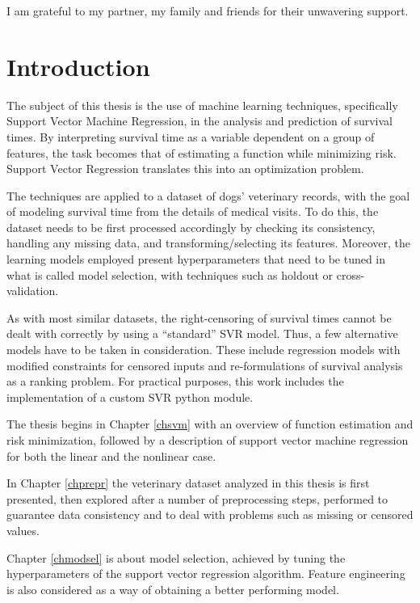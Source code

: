 \documentclass[12pt]{report}
\begin{document}
I am grateful to my partner, my family and friends for their unwavering support.

\afterpreface


\chapter*{Introduction}
\label{intro}
The subject of this thesis is the use of machine learning techniques, specifically Support Vector Machine Regression, in the analysis and prediction of survival times. By interpreting survival time as a variable dependent on a group of features, the task becomes that of estimating a function while minimizing risk. Support Vector Regression translates this into an optimization problem.

The techniques are applied to a dataset of dogs' veterinary records, with the goal of modeling survival time from the details of medical visits. To do this, the dataset needs to be first processed accordingly by checking its consistency, handling any missing data, and transforming/selecting its features. Moreover, the learning models employed present hyperparameters that need to be tuned in what is called model selection, with techniques such as holdout or cross-validation.

As with most similar datasets, the right-censoring of survival times cannot be dealt with correctly by using a ``standard'' SVR model. Thus, a few alternative models have to be taken in consideration. These include regression models with modified constraints for censored inputs and re-formulations of survival analysis as a ranking problem. For practical purposes, this work includes the implementation of a custom SVR python module.

The thesis begins in Chapter \ref{chsvm} with an overview of function estimation and risk minimization, followed by a description of support vector machine regression for both the linear and the nonlinear case.

In Chapter \ref{chprepr} the veterinary dataset analyzed in this thesis is first presented, then explored after a number of preprocessing steps, performed to guarantee data consistency and to deal with problems such as missing or censored values.

Chapter \ref{chmodsel} is about model selection, achieved by tuning the hyperparameters of the support vector regression algorithm. Feature engineering is also considered as a way of obtaining a better performing model.
\end{document}
